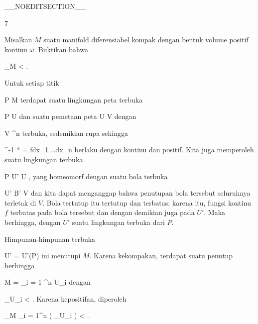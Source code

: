 __NOEDITSECTION__

{7}

{

Misalkan $M$ suatu manifold diferensiabel kompak dengan bentuk volume positif kontinu $\omega$. Buktikan bahwa

\mavergleichskettedisp
{\vergleichskette
{ \int_M \omega
}
{ <} { \infty
}
{ } {
}
{ } {
}
{ } {
}
}
{}{}{}.

}
{

Untuk setiap titik

\mavergleichskette
{\vergleichskette
{ P
}
{ \in }{ M
}
{  }{
}
{    }{
}
{   }{
}
}
{}{}{}
terdapat suatu lingkungan peta terbuka

\mavergleichskette
{\vergleichskette
{ P
}
{ \in }{ U
}
{  }{
}
{    }{
}
{   }{
}
}
{}{}{}
dan suatu pemetaan peta
\maabbdisp {\alpha} { U } { V
} {}
dengan

\mavergleichskette
{\vergleichskette
{ V
}
{ \subseteq }{ \R^n
}
{  }{
}
{    }{
}
{   }{
}
}
{}{}{}
terbuka, sedemikian rupa sehingga

\mavergleichskette
{\vergleichskette
{ \alpha^{-1 *} \omega
}
{ = }{ fdx_1 \wedge \ldots \wedge dx_n
}
{  }{
}
{    }{
}
{   }{
}
}
{}{}{}
berlaku dengan
 kontinu dan positif. Kita juga memperoleh suatu lingkungan terbuka

\mavergleichskette
{\vergleichskette
{ P
}
{ \in }{ U'
}
{ \subseteq }{ U
}
{    }{
}
{   }{
}
}
{}{}{,}
yang homeomorf dengan suatu bola terbuka

\mavergleichskette
{\vergleichskette
{ U'
}
{ \cong }{ B'
}
{ \subseteq }{ V
}
{    }{
}
{   }{
}
}
{}{}{}
dan kita dapat menganggap bahwa penutupan bola tersebut seluruhnya terletak di $V$. Bola tertutup itu tertutup dan terbatas; karena itu, fungsi kontinu $f$ terbatas pada bola tersebut dan dengan demikian juga pada $U'$. Maka
 berhingga, dengan $U'$ suatu lingkungan terbuka dari $P$.

Himpunan-himpunan terbuka

\mavergleichskette
{\vergleichskette
{ U'
}
{ = }{ U'(P)
}
{  }{
}
{    }{
}
{   }{
}
}
{}{}{}
ini menutupi $M$. Karena kekompakan, terdapat suatu penutup berhingga

\mavergleichskettedisp
{\vergleichskette
{ M
}
{ =} { \bigcup_{i = 1} ^n U_i
}
{ } {
}
{ } {
}
{ } {
}
}
{}{}{}
dengan

\mavergleichskettedisp
{\vergleichskette
{ \int_{U_i } \omega
}
{ <} { \infty
}
{ } {
}
{ } {
}
{ } {
}
}
{}{}{.}
Karena kepositifan, diperoleh

\mavergleichskettedisp
{\vergleichskette
{ \int_{M} \omega
}
{ \leq} { \sum_{i = 1}^n  \left(  \int_{U_i } \omega  \right)
}
{ <} { \infty
}
{ } {
}
{ } {
}
}
{}{}{.}

 }

